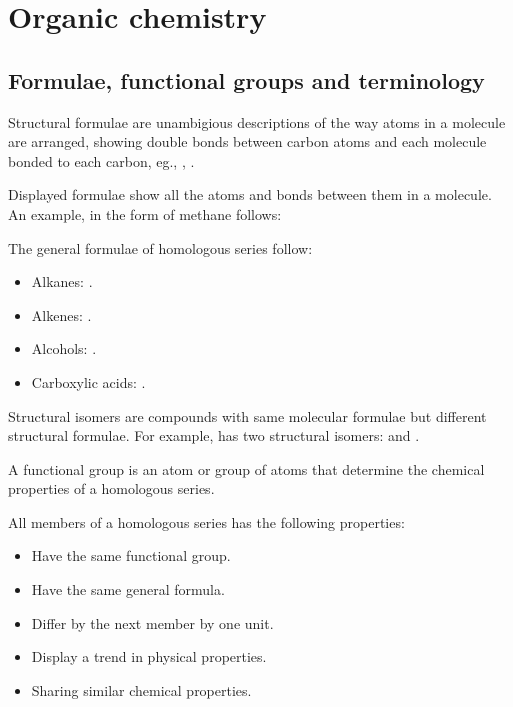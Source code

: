 \newcommand\setpolymerdelim[2]{\def\delimleft{#1}\def\delimright{#2}}
\def\makebraces[#1,#2]#3#4#5{%
	\edef\delimhalfdim{\the\dimexpr(#1+#2)/2}%
	\edef\delimvshift{\the\dimexpr(#1-#2)/2}%
	\chemmove{%
		\node[at=(#4),yshift=(\delimvshift)]
		{$\left\delimleft\vrule height\delimhalfdim depth\delimhalfdim
	width0pt\right.$};%
	\node[at=(#5),yshift=(\delimvshift)]
	{$\left.\vrule height\delimhalfdim depth\delimhalfdim
width0pt\right\delimright_{\rlap{$\scriptstyle#3$}}$};}}
\setpolymerdelim()

\section{Organic chemistry}
\subsection{Formulae, functional groups and terminology}
Structural formulae are unambigious descriptions of the way atoms in a molecule are arranged,
showing double bonds between carbon atoms and each molecule bonded to each carbon, eg., 
, .

Displayed formulae show all the atoms and bonds between them in a molecule. An example, in the form
of methane follows:
\begin{center}
\end{center}

The general formulae of homologous series follow:

\begin{itemize}
	\item Alkanes: .
	\item Alkenes: .
	\item Alcohols: .
	\item Carboxylic acids: .
\end{itemize}

Structural isomers are compounds with same molecular formulae but different structural formulae.
For example,  has two structural isomers:  and 
.

A functional group is an atom or group of atoms that determine the chemical properties of a 
homologous series.

All members of a homologous series has the following properties:
\begin{itemize}
	\item Have the same functional group.
	\item Have the same general formula.
	\item Differ by the next member by one  unit.
	\item Display a trend in physical properties.
	\item Sharing similar chemical properties.
\end{itemize}

